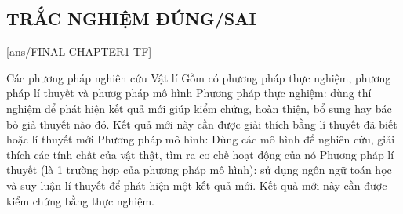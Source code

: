 \subsection{TRẮC NGHIỆM ĐÚNG/SAI}
\setcounter{ex}{0}
[ans/FINAL-CHAPTER1-TF]
\begin{ex}
	{Các phương pháp nghiên cứu Vật lí} \choiceTF
	{Gồm có phương pháp thực nghiệm, phương pháp lí thuyết và phươg pháp mô hình}
	{\True Phương pháp thực nghiệm: dùng thí nghiệm để phát hiện kết quả mới giúp kiểm chứng, hoàn thiện, bổ sung hay bác bỏ giả thuyết nào đó. Kết quả mới này cần được giải thích bằng lí thuyết đã biết hoặc lí thuyết mới}
	{\True Phương pháp mô hình: Dùng các mô hình để nghiên cứu, giải thích các tính chất của vật thật, tìm ra cơ chế hoạt động của nó}
	{\True Phương pháp lí thuyết (là 1 trường hợp của phương pháp mô hình): sử dụng ngôn ngữ toán học và suy luận lí thuyết để phát hiện một kết quả mới. Kết quả mới này cần được kiểm chứng bằng thực nghiệm.}
\end{ex}

